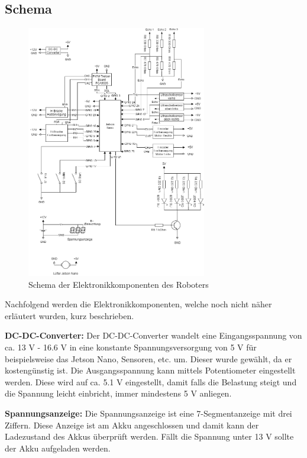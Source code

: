 \subsection{Schema}
\begin{figure}[h]
  \includegraphics[width=0.7\textwidth]{img/Elektronik/schema.png}
  \centering
  \caption{Schema der Elektronikkomponenten des Roboters}
  \label{fig:schema}
\end{figure}

Nachfolgend werden die Elektronikkomponenten, welche noch nicht näher erläutert wurden, kurz beschrieben.

\textbf{DC-DC-Converter:} Der DC-DC-Converter wandelt eine Eingangsspannung von ca. 13 V - 16.6 V in eine konstante Spannungsversorgung von 5 V für beispielsweise das Jetson Nano, Sensoren, etc. um. Dieser wurde gewählt, da er kostengünstig ist. Die Ausgangsspannung kann mittels Potentiometer eingestellt werden. Diese wird auf ca. 5.1 V eingestellt, damit falls die Belastung steigt und die Spannung leicht einbricht, immer mindestens 5 V anliegen. 

\textbf{Spannungsanzeige:} Die Spannungsanzeige ist eine 7-Segmentanzeige mit drei Ziffern. Diese Anzeige ist am Akku angeschlossen und damit kann der Ladezustand des Akkus überprüft werden. Fällt die Spannung unter 13 V sollte der Akku aufgeladen werden.

